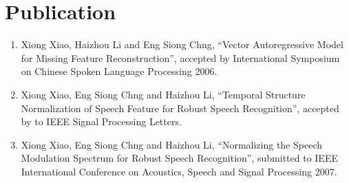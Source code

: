 \chapter* {Publication}

\begin{enumerate}
    \item Xiong Xiao, Haizhou Li and Eng Siong Chng, ``Vector
    Autoregressive Model for Missing Feature Reconstruction'', accepted
    by International Symposium on Chinese Spoken Language Processing
    2006.
    \item Xiong Xiao, Eng Siong Chng and Haizhou Li, ``Temporal
    Structure Normalization of Speech Feature for Robust Speech
    Recognition'', accepted by to IEEE Signal Processing Letters.
    \item Xiong Xiao, Eng Siong Chng and Haizhou Li, ``Normalizing
    the Speech Modulation Spectrum for Robust Speech
    Recognition'', submitted to IEEE International Conference on Acoustics,
    Speech and Signal Processing 2007.
\end{enumerate}
